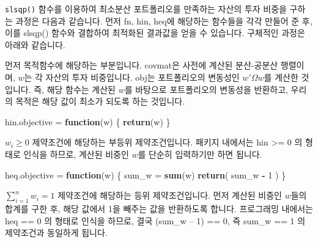 \documentclass[12pt,]{book}
\newenvironment{Shaded}{\begin{snugshade}}{\end{snugshade}}
\newcommand{\ControlFlowTok}[1]{\textcolor[rgb]{0.13,0.29,0.53}{\textbf{#1}}}
\newcommand{\DecValTok}[1]{\textcolor[rgb]{0.00,0.00,0.81}{#1}}
\newcommand{\KeywordTok}[1]{\textcolor[rgb]{0.13,0.29,0.53}{\textbf{#1}}}
\newcommand{\NormalTok}[1]{#1}
\newcommand{\OperatorTok}[1]{\textcolor[rgb]{0.81,0.36,0.00}{\textbf{#1}}}
\newcommand{\StringTok}[1]{\textcolor[rgb]{0.31,0.60,0.02}{#1}}
\begin{document}
\texttt{slsqp()} 함수를 이용하여 최소분산 포트폴리오를 만족하는 자산의 투자 비중을 구하는 과정은 다음과 같습니다. 먼저 fn, hin, heq에 해당하는 함수들을 각각 만들어 준 후, 이를 slsqp() 함수와 결합하여 최적화된 결과값을 얻을 수 있습니다. 구체적인 과정은 아래와 같습니다.

\begin{Shaded}
\end{Shaded}

먼저 목적함수에 해당하는 부분입니다. covmat은 사전에 계산된 분산-공분산 행렬이며, \(w\)는 각 자산의 투자 비중입니다. obj는 포트폴리오의 변동성인 \(w'\Omega w\)를 계산한 것입니다. 즉, 해당 함수는 계산된 \(w\)를 바탕으로 포트폴리오의 변동성을 반환하고, 우리의 목적은 해당 값이 최소가 되도록 하는 것입니다.

\begin{Shaded}
\begin{Highlighting}[]
\NormalTok{hin.objective =}\StringTok{ }\ControlFlowTok{function}\NormalTok{(w) \{}
  \KeywordTok{return}\NormalTok{(w)}
\NormalTok{\}}
\end{Highlighting}
\end{Shaded}

\(w_i \ge 0\) 제약조건에 해당하는 부등위 제약조건입니다. 패키지 내에서는 hin \textgreater{}= 0 의 형태로 인식을 하므로, 계산된 비중인 \(w\)를 단순히 입력하기만 하면 됩니다.

\begin{Shaded}
\begin{Highlighting}[]
\NormalTok{heq.objective =}\StringTok{ }\ControlFlowTok{function}\NormalTok{(w) \{}
\NormalTok{  sum_w =}\StringTok{ }\KeywordTok{sum}\NormalTok{(w)}
  \KeywordTok{return}\NormalTok{( sum_w }\OperatorTok{-}\StringTok{ }\DecValTok{1}\NormalTok{ )}
\NormalTok{\}}
\end{Highlighting}
\end{Shaded}

\(\sum_{i=1}^{n}w_i = 1\) 제약조건에 해당하는 등위 제약조건입니다. 먼저 계산된 비중인 \(w\)들의 합계를 구한 후, 해당 값에서 1을 빼주는 값을 반환하도록 합니다. 프로그래밍 내에서는 heq == 0 의 형태로 인식을 하므로, 결국 (sum\_w -- 1) == 0, 즉 sum\_w == 1 의 제약조건과 동일하게 됩니다.
\end{document}
